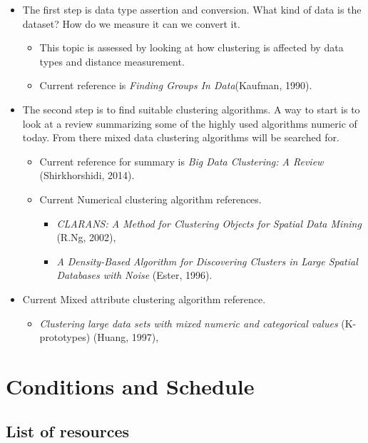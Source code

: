 \documentclass[a4paper,11pt]{article}
\begin{document}
\begin{itemize}
\item
  The first step is data type assertion and conversion. What kind of
  data is the dataset? How do we measure it can we convert it.

  \begin{itemize}
    \item
      This topic is assessed by looking at how clustering is affected by
      data types and distance measurement.
    \item
      Current reference is \textit{Finding Groups In Data}(Kaufman, 1990)\cite{Kaufman1990}.
  \end{itemize}
\item
  The second step is to find suitable clustering algorithms. A way to
  start is to look at a review summarizing some of the highly used
  algorithms numeric of today. From there mixed data clustering algorithms will be searched for.
  \begin{itemize}
  \item
    Current reference for summary is \textit{Big Data Clustering: A
    Review} (Shirkhorshidi, 2014)\cite{Shirkhorshidi2014}.
  \item
    Current Numerical clustering algorithm references.
      \begin{itemize}
        \item \textit{CLARANS: A Method for Clustering Objects for Spatial Data Mining} (R.Ng, 2002)\cite{Ng2002},
        \item \textit{A Density-Based Algorithm for Discovering Clusters in
    Large Spatial Databases with Noise} (Ester, 1996)\cite{Ester1996}.
      \end{itemize}
  \end{itemize}
  \item
    Current Mixed attribute clustering algorithm reference.
      \begin{itemize}
        \item \textit{Clustering large data sets with mixed numeric and categorical values} (K-prototypes) (Huang, 1997)\cite{Huang97clusteringlarge},
      \end{itemize}
\end{itemize}

\section{Conditions and Schedule}

\subsection{List of resources}
\end{document}
